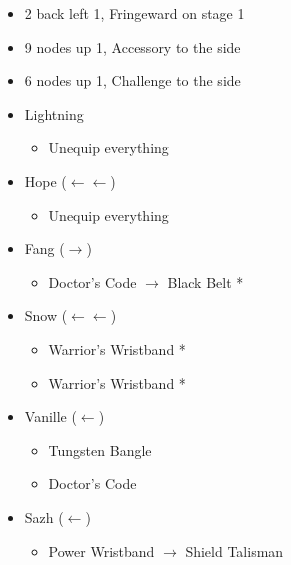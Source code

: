 \begin{menu}
\begin{itemize}
\begin{itemize}
\begin{itemize}
\begin{itemize}
						            \item 2 back left 1, Fringeward on stage 1
						            \item 9 nodes up 1, Accessory to the side
						            \item 6 nodes up 1, Challenge to the side
					            \end{itemize}
				      \end{itemize}
			\end{itemize}
			\equip
			\begin{itemize}
				\item Lightning
				      \begin{itemize}
					      \item Unequip everything
				      \end{itemize}
				\item Hope ($\leftarrow\leftarrow$)
				      \begin{itemize}
					      \item Unequip everything
				      \end{itemize}
				\item Fang ($\rightarrow$)
					            \begin{itemize}
						            \item Doctor's Code $\rightarrow$ Black Belt *
					            \end{itemize}
				\item Snow ($\leftarrow\leftarrow$)
				      \begin{itemize}
						            \item Warrior's Wristband *
						            \item Warrior's Wristband *
					            \end{itemize}
				\item Vanille ($\leftarrow$)
				      \begin{itemize}
						            \item Tungsten Bangle
						            \item Doctor's Code
					            \end{itemize}
				\item Sazh ($\leftarrow$)
				      \begin{itemize}
						            \item Power Wristband $\rightarrow$ Shield Talisman
					            \end{itemize}
			\end{itemize}
		\end{itemize}
\end{menu}
\vfill

